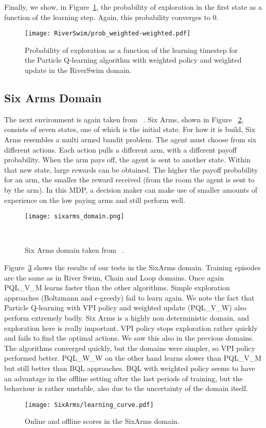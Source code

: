 Finally, we show, in Figure~\ref{fig:riverswim_prob_evolution}, the probability of exploration in the first state as a function of the learning step. Again, this probability converges to 0.
\begin{figure}
  \centering
  \texttt{[image: RiverSwim/prob\_weighted-weighted.pdf]}
  \label{fig:riverswim_prob_weighted_weighted}
\caption{Probability of exploration as a function of the learning timestep for the Particle Q-learning algorithm with weighted policy and weighted update in the RiverSwim domain.}
\label{fig:riverswim_prob_evolution}
\end{figure}
\subsection{Six Arms Domain}
The next environment is again taken from ~\cite{Strehl2008AnAO}. Six Arms, shown in Figure ~\ref{fig:sixarms_domain}, consists of seven states, one of which is the initial state. For how it is build, Six Arms resembles a multi armed bandit problem. The agent must choose from six different actions. Each action pulls a different arm, with a different payoff probability. When the arm pays off, the agent is sent to another state. Within that new state, large rewards can be obtained. The higher the payoff probability for an arm, the smaller the reward received (from the room the agent is sent to by the arm). In this MDP, a decision maker can make use of smaller amounts of experience on the low paying arms and still perform well.\par
\begin{figure}
 \texttt{[image: sixarms\_domain.png]}
 \caption{Six Arms domain taken from ~\cite{Strehl2008AnAO}.} ~
\label{fig:sixarms_domain}
\end{figure}
Figure~\ref{fig:sixarms_learning_curve} shows the results of our tests in the SixArms domain. Training episodes are the same as in River Swim, Chain and Loop domains. Once again PQL\_V\_M learns faster than the other algorithms. Simple exploration approaches (Boltzmann and $\epsilon$-greedy) fail to learn again. We note the fact that Particle Q-learning with VPI policy and weighted update (PQL\_V\_W) also perform extremely badly. Six Arms is a highly non deterministic domain, and exploration here is really important. VPI policy stops exploration rather quickly and fails to find the optimal actions. We saw this also in the previous domains. The algorithms converged quickly, but the domains were simpler, so VPI policy performed better. PQL\_W\_W on the other hand learns slower than PQL\_V\_M but still better than BQL approaches. BQL with weighted policy seems to have an advantage in the offline setting after the last periods of training, but the behaviour is rather unstable, also due to the uncertainty of the domain itself.
\begin{figure}
 \texttt{[image: SixArms/learning\_curve.pdf]}
 \caption{Online and offline scores in the SixArms domain.}
 \label{fig:sixarms_learning_curve}
\end{figure}
